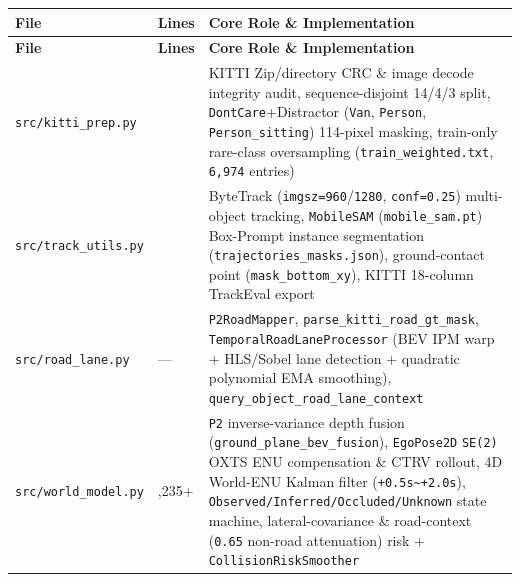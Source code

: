 \documentclass[10.5pt,a4paper]{article}
\begin{document}
\begin{footnotesize}
\setlength{\tabcolsep}{4pt}
\setlength{\LTleft}{0pt}\setlength{\LTright}{0pt}
\begin{longtable}{>{\raggedright\arraybackslash}p{} >{\raggedright\arraybackslash}p{} >{\raggedright\arraybackslash}p{}}
\toprule
\textbf{File} & \textbf{Lines} & \textbf{Core Role \& Implementation} \\
\midrule
\endfirsthead
\toprule
\textbf{File} & \textbf{Lines} & \textbf{Core Role \& Implementation} \\
\midrule
\endhead
\bottomrule
\endfoot
\texttt{src/\allowbreak{}kitti\_\allowbreak{}prep.\allowbreak{}py} & 624 & KITTI Zip/directory CRC \& image decode integrity audit, sequence-disjoint 14/4/3 split, \texttt{DontCare}+Distractor (\texttt{Van}, \texttt{Person}, \texttt{Person\_\allowbreak{}sitting}) 114-pixel masking, train-only rare-class oversampling (\texttt{train\_\allowbreak{}weighted.\allowbreak{}txt}, \texttt{6,\allowbreak{}974} entries) \\
\texttt{src/\allowbreak{}track\_\allowbreak{}utils.\allowbreak{}py} & 620 & ByteTrack (\texttt{imgsz=960}/\texttt{1280}, \texttt{conf=0.\allowbreak{}25}) multi-object tracking, \texttt{MobileSAM} (\texttt{mobile\_\allowbreak{}sam.\allowbreak{}pt}) Box-Prompt instance segmentation (\texttt{trajectories\_\allowbreak{}masks.\allowbreak{}json}), ground-contact point (\texttt{mask\_\allowbreak{}bottom\_\allowbreak{}xy}), KITTI 18-column TrackEval export \\
\texttt{src/\allowbreak{}road\_\allowbreak{}lane.\allowbreak{}py} & --- & \texttt{P2RoadMapper}, \texttt{parse\_\allowbreak{}kitti\_\allowbreak{}road\_\allowbreak{}gt\_\allowbreak{}mask}, \texttt{TemporalRoadLaneProcessor} (BEV IPM warp + HLS/Sobel lane detection + quadratic polynomial EMA smoothing), \texttt{query\_\allowbreak{}object\_\allowbreak{}road\_\allowbreak{}lane\_\allowbreak{}context} \\
\texttt{src/\allowbreak{}world\_\allowbreak{}model.\allowbreak{}py} & 1,235+ & \texttt{P2} inverse-variance depth fusion (\texttt{ground\_\allowbreak{}plane\_\allowbreak{}bev\_\allowbreak{}fusion}), \texttt{EgoPose2D} \texttt{SE(2)} OXTS ENU compensation \& CTRV rollout, 4D World-ENU Kalman filter (\texttt{+0.\allowbreak{}5s\textasciitilde{}+2.\allowbreak{}0s}), \texttt{Observed/\allowbreak{}Inferred/\allowbreak{}Occluded/\allowbreak{}Unknown} state machine, lateral-covariance \& road-context (\texttt{0.\allowbreak{}65} non-road attenuation) risk + \texttt{CollisionRiskSmoother} \\

\end{longtable}
\end{footnotesize}
\end{document}
